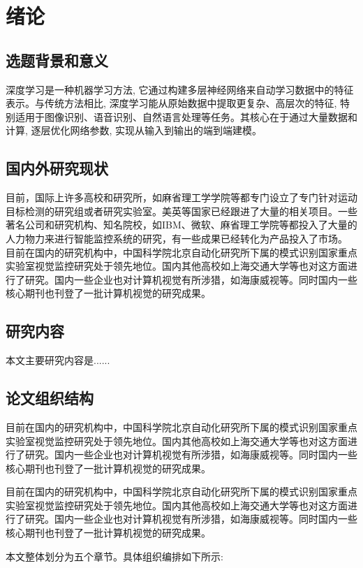 \documentclass[UTF8, twoside]{ctexart}
\begin{document}
\section{绪论}
\subsection{选题背景和意义}
深度学习是一种机器学习方法, 它通过构建多层神经网络来自动学习数据中的特征表示\cite{LeCun2015}。与传统方法相比, 深度学习能从原始数据中提取更复杂、高层次的特征, 特别适用于图像识别、语音识别、自然语言处理等任务\cite{alexnet, hinton2012deep}。其核心在于通过大量数据和计算, 逐层优化网络参数, 实现从输入到输出的端到端建模\cite{LeCun2015}。

\subsection{国内外研究现状}
目前，国际上许多高校和研究所，如麻省理工学学院等都专门设立了专门针对运动目标检测的研究组或者研究实验室。美英等国家已经跟进了大量的相关项目。一些著名公司和研究机构、知名院校，如IBM、微软、麻省理工学院等都投入了大量的人力物力来进行智能监控系统的研究，有一些成果已经转化为产品投入了市场。
目前在国内的研究机构中，中国科学院北京自动化研究所下属的模式识别国家重点实验室视觉监控研究处于领先地位。国内其他高校如上海交通大学等也对这方面进行了研究。国内一些企业也对计算机视觉有所涉猎，如海康威视等。同时国内一些核心期刊也刊登了一批计算机视觉的研究成果。

\subsection{研究内容}
本文主要研究内容是......

\subsection{论文组织结构}
目前在国内的研究机构中，中国科学院北京自动化研究所下属的模式识别国家重点实验室视觉监控研究处于领先地位。国内其他高校如上海交通大学等也对这方面进行了研究。国内一些企业也对计算机视觉有所涉猎，如海康威视等。同时国内一些核心期刊也刊登了一批计算机视觉的研究成果。

目前在国内的研究机构中，中国科学院北京自动化研究所下属的模式识别国家重点实验室视觉监控研究处于领先地位。国内其他高校如上海交通大学等也对这方面进行了研究。国内一些企业也对计算机视觉有所涉猎，如海康威视等。同时国内一些核心期刊也刊登了一批计算机视觉的研究成果。

本文整体划分为五个章节。具体组织编排如下所示:
\end{document}
